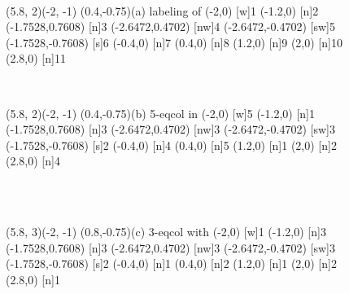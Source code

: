 \begin{figure}[h]
  \centering ~~~~~~~~~~~
\begin{graph}(5.8, 2)(-2, -1)
	\freetext(0.4,-0.75){(a) labeling of }
	(-2,0)
	{1}
	(-1.2,0)
	{2}
	(-1.7528,0.7608)
	{3}
	(-2.6472,0.4702)
	[nw]{4}
	(-2.6472,-0.4702)
	[sw]{5}
	(-1.7528,-0.7608)
	{6}
	(-0.4,0)
	{7}
	(0.4,0)
	{8}
	(1.2,0)
	{9}
	(2,0)
	{10}
	(2.8,0)
	{11}
\end{graph}~~~~~~~
\begin{graph}(5.8, 2)(-2, -1)
	\freetext(0.4,-0.75){(b) 5-eqcol in }
	(-2,0)
	{5}
	(-1.2,0)
	{1}
	(-1.7528,0.7608)
	{3}
	(-2.6472,0.4702)
	[nw]{3}
	(-2.6472,-0.4702)
	[sw]{3}
	(-1.7528,-0.7608)
	{2}
	(-0.4,0)
	{4}
	(0.4,0)
	{5}
	(1.2,0)
	{1}
	(2,0)
	{2}
	(2.8,0)
	{4}
\end{graph}\\~~~~~~~~~~~
\begin{graph}(5.8, 3)(-2, -1)
	\freetext(0.8,-0.75){(c) 3-eqcol with }
	(-2,0)
	{1}
	(-1.2,0)
	{3}
	(-1.7528,0.7608)
	{3}
	(-2.6472,0.4702)
	[nw]{3}
	(-2.6472,-0.4702)
	[sw]{3}
	(-1.7528,-0.7608)
	{2}
	(-0.4,0)
	{1}
	(0.4,0)
	{2}
	(1.2,0)
	{1}
	(2,0)
	{2}
	(2.8,0)
	{1}

\end{graph}
\end{figure}
